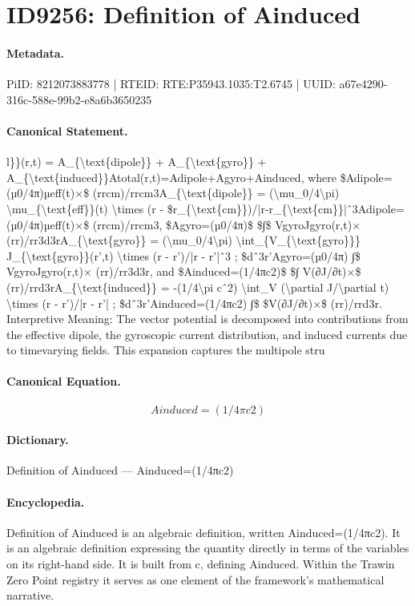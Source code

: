 \section*{ID9256: Definition of Ainduced}
\paragraph{Metadata.}
PiID: 8212073883778 | RTEID: RTE:P35943.1035:T2.6745 | UUID: a67e4290-316c-588e-99b2-e8a6b3650235

\paragraph{Canonical Statement.}
l\}\}(r,t) = A\_\{\textbackslash{}text\{dipole\}\} + A\_\{\textbackslash{}text\{gyro\}\} + A\_\{\textbackslash{}text\{induced\}\}Atotal(r,t)=Adipole+Agyro+Ainduced, where \$Adipole=(µ0/4π)µeff(t)×\$ (rrcm)/rrcm3A\_\{\textbackslash{}text\{dipole\}\} = (\textbackslash{}mu\_0/4\textbackslash{}pi) \textbackslash{}mu\_\{\textbackslash{}text\{eff\}\}(t) \textbackslash{}times (r - \$r\_\{\textbackslash{}text\{cm\}\})/|r-r\_\{\textbackslash{}text\{cm\}\}|ˆ3Adipole=(µ0/4π)µeff(t)×\$ (rrcm)/rrcm3, \$Agyro=(µ0/4π)\$ \$∫\$ VgyroJgyro(r,t)× (rr)/rr3d3rA\_\{\textbackslash{}text\{gyro\}\} = (\textbackslash{}mu\_0/4\textbackslash{}pi) \textbackslash{}int\_\{V\_\{\textbackslash{}text\{gyro\}\}\} J\_\{\textbackslash{}text\{gyro\}\}(r’,t) \textbackslash{}times (r - r’)/|r - r’|ˆ3 ; \$dˆ3r’Agyro=(µ0/4π) ∫\$ VgyroJgyro(r,t)× (rr)/rr3d3r, and \$Ainduced=(1/4πc2)\$ \$∫ V(∂J/∂t)×\$ (rr)/rrd3rA\_\{\textbackslash{}text\{induced\}\} = -(1/4\textbackslash{}pi cˆ2) \textbackslash{}int\_V (\textbackslash{}partial J/\textbackslash{}partial t) \textbackslash{}times (r - r’)/|r - r’| ; \$dˆ3r’Ainduced=(1/4πc2) ∫\$ \$V(∂J/∂t)×\$ (rr)/rrd3r. Interpretive Meaning: The vector potential is decomposed into contributions from the effective dipole, the gyroscopic current distribution, and induced currents due to timevarying fields. This expansion captures the multipole stru

\paragraph{Canonical Equation.}
\[
Ainduced=(1/4πc2)
\]

\paragraph{Dictionary.}
Definition of Ainduced — Ainduced=(1/4πc2)

\paragraph{Encyclopedia.}
Definition of Ainduced is an algebraic definition, written Ainduced=(1/4πc2). It is an algebraic definition expressing the quantity directly in terms of the variables on its right-hand side. It is built from c, defining Ainduced. Within the Trawin Zero Point registry it serves as one element of the framework's mathematical narrative.
